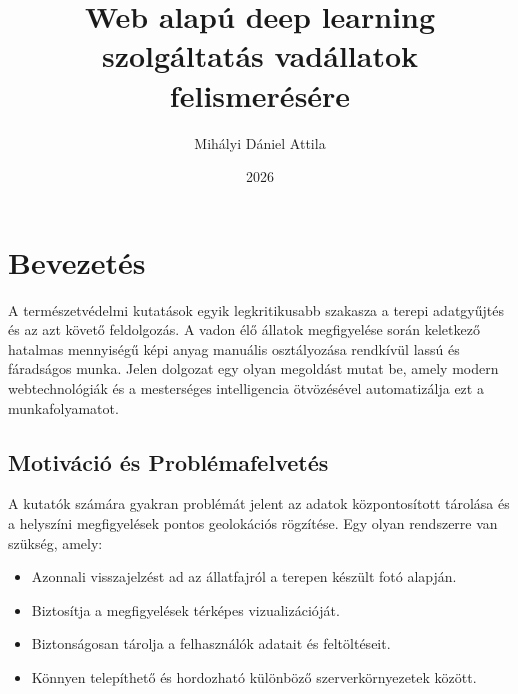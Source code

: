 \documentclass[
	parspace, %
]{elteikthesis}[2024/04/26]
\title{Web alapú deep learning szolgáltatás vadállatok felismerésére}
\date{2026}
\author{Mihályi Dániel Attila}
\affiliation{Egyetemi Adjunktus}
\begin{document}

\maketitle

\tableofcontents
\cleardoublepage

\chapter{Bevezetés}
\label{ch:intro}

A természetvédelmi kutatások egyik legkritikusabb szakasza a terepi adatgyűjtés és az azt követő feldolgozás. A vadon élő állatok megfigyelése során keletkező hatalmas mennyiségű képi anyag manuális osztályozása rendkívül lassú és fáradságos munka. Jelen dolgozat egy olyan megoldást mutat be, amely modern webtechnológiák és a mesterséges intelligencia ötvözésével automatizálja ezt a munkafolyamatot.

\section{Motiváció és Problémafelvetés}
A kutatók számára gyakran problémát jelent az adatok központosított tárolása és a helyszíni megfigyelések pontos geolokációs rögzítése. Egy olyan rendszerre van szükség, amely:
\begin{itemize}
    \item Azonnali visszajelzést ad az állatfajról a terepen készült fotó alapján.
    \item Biztosítja a megfigyelések térképes vizualizációját.
    \item Biztonságosan tárolja a felhasználók adatait és feltöltéseit.
    \item Könnyen telepíthető és hordozható különböző szerverkörnyezetek között.
\end{itemize}
\end{document}
